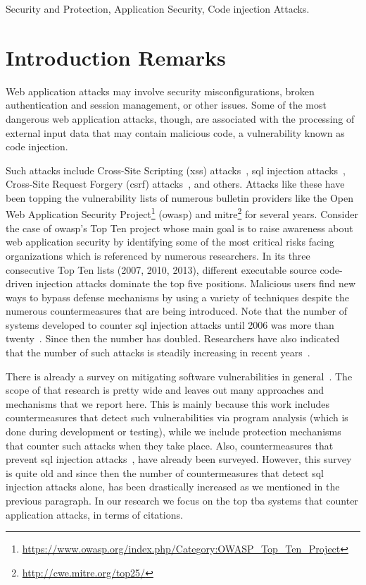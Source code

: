 \documentclass[conference]{IEEEtran}
\begin{document}
\begin{IEEEkeywords}
Security and Protection, Application Security, Code injection Attacks.
\end{IEEEkeywords}

\IEEEpeerreviewmaketitle

\section{Introduction Remarks}

Web application attacks may involve security misconfigurations,
broken authentication and session management, or other issues.
Some of the most dangerous web application attacks, though,
are associated with the processing of external input data
that may contain malicious code, a vulnerability known as
code injection.

Such attacks include Cross-Site Scripting ({\sc xss})
attacks~\cite{SG07}, {\sc sql} injection attacks~\cite{RL12b},
Cross-Site Request Forgery ({\sc csrf}) attacks~\cite{LZRL09}, and
others. Attacks like these have been topping the vulnerability lists
of numerous bulletin providers like the Open Web Application Security
Project\footnote{\url{https://www.owasp.org/index.php/Category:OWASP_Top_Ten_Project}}
({\sc owasp}) and
{\sc mitre}\footnote{\url{http://cwe.mitre.org/top25/}} for several
years. Consider the case of {\sc owasp}'s Top Ten project whose main
goal is to raise awareness about web application security by
identifying some of the most critical risks facing organizations which
is referenced by numerous researchers. In its three consecutive Top
Ten lists (2007, 2010, 2013), different executable source code-driven
injection attacks dominate the top five positions. Malicious users
find new ways to bypass defense mechanisms by using a variety of
techniques despite the numerous countermeasures that are being
introduced. Note that the number of systems developed to counter
{\sc sql} injection attacks until 2006 was more than twenty~\cite{HVO06}.
Since then the number has doubled.
Researchers have also indicated that the number of such attacks
is steadily increasing in recent years~\cite{SSL12}.

There is already a survey on mitigating
software vulnerabilities in general~\cite{SZ12}.
The scope of that research is pretty wide and leaves
out many approaches and mechanisms that we report here.
This is mainly because this work includes countermeasures
that detect such vulnerabilities via program analysis
(which is done during development or testing), while
we include protection mechanisms that counter
such attacks when they take place.
Also, countermeasures that prevent {\sc sql}
injection attacks~\cite{HVO06}, have already been surveyed.
However, this survey is quite old and since then
the number of countermeasures that detect {\sc sql}
injection attacks alone, has been drastically increased
as we mentioned in the previous paragraph.
In our research we focus on the top
{\sc tba} systems that counter application attacks,
in terms of citations.
\end{document}
